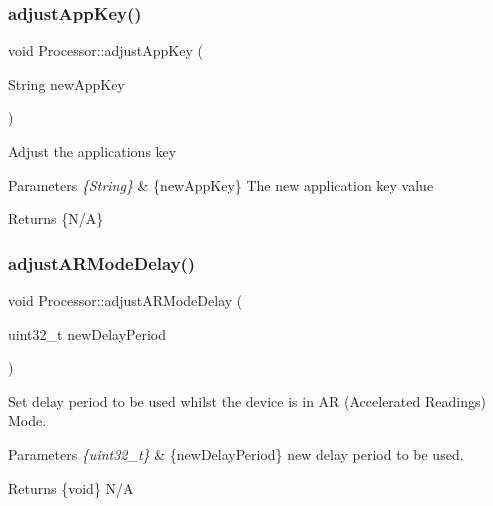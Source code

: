 \subsubsection{\texorpdfstring{adjust\+App\+Key()}{adjustAppKey()}}
{\footnotesize\ttfamily void Processor\+::adjust\+App\+Key (\begin{DoxyParamCaption}\item[{String}]{new\+App\+Key }\end{DoxyParamCaption})}

Adjust the application\textquotesingle{}s key 
\begin{DoxyParams}{Parameters}
{\em \{\+String\}} & \{new\+App\+Key\} The new application key value \\
\hline
\end{DoxyParams}
\begin{DoxyReturn}{Returns}
\{N/A\} 
\end{DoxyReturn}
\mbox{\label{class_processor_a5b6762cf2679f4f47365aacb47b59ef5}} 
\subsubsection{\texorpdfstring{adjust\+A\+R\+Mode\+Delay()}{adjustARModeDelay()}}
{\footnotesize\ttfamily void Processor\+::adjust\+A\+R\+Mode\+Delay (\begin{DoxyParamCaption}\item[{uint32\+\_\+t}]{new\+Delay\+Period }\end{DoxyParamCaption})}

Set delay period to be used whilst the device is in AR (Accelerated Readings) Mode. 
\begin{DoxyParams}{Parameters}
{\em \{uint32\+\_\+t\}} & \{new\+Delay\+Period\} new delay period to be used. \\
\hline
\end{DoxyParams}
\begin{DoxyReturn}{Returns}
\{void\} N/A 
\end{DoxyReturn}
\mbox{\label{class_processor_a58a2f6a482491cb003f4ff1bd45ba891}} 
